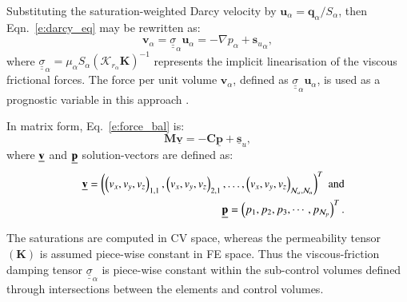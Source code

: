 \documentclass[preprint,authoryear,12pt]{elsarticle}
\begin{document}
Substituting the saturation-weighted Darcy velocity by $\mathbf{u}_\alpha= \mathbf{q}_\alpha/S_\alpha$, then Eqn.~\ref{e:darcy_eq} may be rewritten as:
\begin{equation}
  \mathbf{v}_\alpha={\underline {\underline \sigma}}_{\alpha} \mathbf{u}_{\alpha} = - \nabla p_{\alpha} + {\mathbf{s}_{u}}_{\alpha},
  \label{e:force_bal}
\end{equation}
where ${\underline {\underline \sigma}}_{\alpha}=\mu_\alpha S_\alpha \left(\mathcal{K}_{{r}_\alpha}\mathbf{K}\right)^{-1}$ represents the implicit linearisation of the viscous frictional forces. The force per unit volume $\mathbf{v}_\alpha$, defined as ${\underline {\underline \sigma}}_{\alpha} \mathbf{u}_\alpha$, is used as a prognostic variable in this approach \citep{pavlidis_2014}.

In matrix form, Eq.~\ref{e:force_bal} is: %
\begin{equation}
  {\mathbf M} \underline {\mathbf v} = -{\mathbf C} \underline{\mathbf p} + \underline {\mathbf s}_{u}, \label{force-balance-matrix-form}
\end{equation}
where $\underline{\bf v}$ and $\underline{\bf p}$ solution-vectors are defined as:
\begin{eqnarray}
    &&\underline{{\bf v}} = \left( \left( {v_x},{v_y},{v_z} \right)_{1,1}, \left( {v_x},{v_y},{v_z} \right)  _{2,1},\ldots, \left( {v_x},{v_y},{v_z} \right)_{\mathcal{N}_\alpha,\mathcal{N}_u} \right)^{T} \;\text{and} \nonumber \\ 
    && \underline{{\bf p}} = \left(p_1, p_2, p_3, \cdots, p_{\mathcal{N}_p}\right)^T. \nonumber%
\end{eqnarray}

The saturations are computed in CV space, whereas the permeability tensor $\left(\mathbf{K}\right)$ is assumed piece-wise constant in FE space. Thus the viscous-friction damping tensor $ {\underline {\underline \sigma}}_{\alpha}$ is piece-wise constant within the sub-control volumes defined through intersections between the elements and control volumes.
\end{document}
